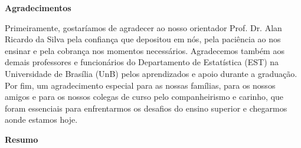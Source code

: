 \documentclass[12pt, a4paper, twoside]{report}
\numberwithin{equation}{section} %
\begin{document}




\vspace*{2.5cm}

\begin{center}
 {\Huge \bfseries Agradecimentos}
\end{center}
\baselineskip 19.5pt 
\vspace*{1.5cm}


Primeiramente, gostaríamos de agradecer ao nosso orientador Prof. Dr. Alan Ricardo da Silva pela confiança que depositou em nós, pela paciência ao nos ensinar e pela cobrança nos momentos necessários.
Agradecemos também aos demais professores e funcionários do Departamento de Estatística (EST) na Universidade de Brasília (UnB) pelos aprendizados e apoio durante a graduação. Por fim, um agradecimento especial para as nossas famílias, para os nossos amigos e para os nossos colegas de curso pelo companheirismo e carinho, que foram essenciais para enfrentarmos os desafios do ensino superior e chegarmos aonde estamos hoje.

\newpage


\vspace*{2.5cm}
\begin{center}
 {\Huge \bfseries Resumo}
\end{center}
\baselineskip 19.5pt 
\vspace*{1.5cm}
\end{document}
